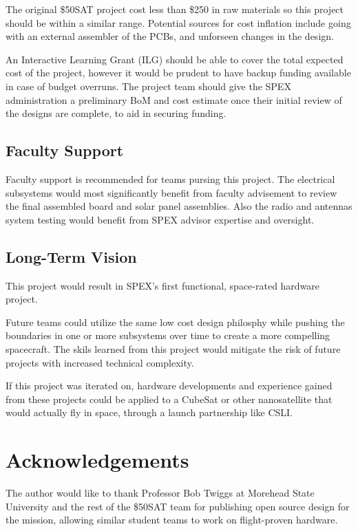 \documentclass[conference]{IEEEtran} %
\begin{document}
The original \$50SAT project cost less than \$250 in raw materials so this project should be within a similar range.
Potential sources for cost inflation include going with an external assembler of the PCBs, and unforseen changes in the design.

An Interactive Learning Grant (ILG) should be able to cover the total expected cost of the project, however it would be prudent to have backup funding available in case of budget overruns.
The project team should give the SPEX administration a preliminary BoM and cost estimate once their initial review of the designs are complete, to aid in securing funding.

\subsection{Faculty Support}
Faculty support is recommended for teams pursing this project.
The electrical subsystems would most significantly benefit from faculty advisement to review the final assembled board and solar panel assemblies.
Also the radio and antennas system testing would benefit from SPEX advisor expertise and oversight.

\subsection{Long-Term Vision}
\label{sec:vision}
This project would result in SPEX's first functional, space-rated hardware project.

Future teams could utilize the same low cost design philosphy while pushing the boundaries in one or more subsystems over time to create a more compelling spacecraft.
The skils learned from this project would mitigate the risk of future projects with increased technical complexity.

If this project was iterated on, hardware developments and experience gained from these projects could be applied to a CubeSat or other nanosatellite that would actually fly in space, through a launch partnership like CSLI.

\section*{Acknowledgements}
The author would like to thank Professor Bob Twiggs at Morehead State University and the rest of the \$50SAT team for publishing open source design for the mission, allowing similar student teams to work on flight-proven hardware.
\end{document}
